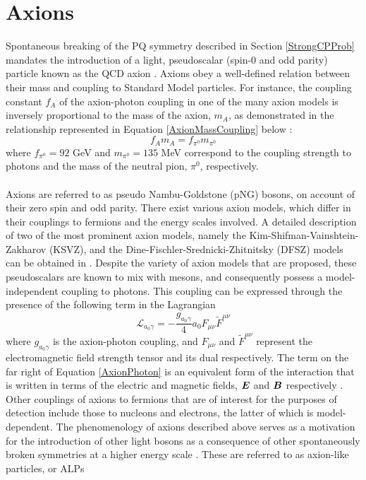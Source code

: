 \section{Axions}
Spontaneous breaking of the PQ symmetry described in Section \ref{StrongCPProb} mandates the introduction of a light, pseudoscalar (spin-0 and odd parity) particle known as the QCD axion \cite{article}. Axions obey a well-defined relation between their mass and coupling
to Standard Model particles. For instance, the coupling constant $f_{A}$ of the axion-photon coupling in one of the many axion models is inversely proportional to the mass of the axion, $m_{A}$, as demonstrated in the relationship represented in Equation \ref{AxionMassCoupling} below \cite{Michael:920}:
\begin{equation}\label{AxionMassCoupling}
    f_{A}m_{A} = f_{\pi^{0}}m_{\pi^{0}}
\end{equation}
where $f_{\pi^{0}} = 92$ GeV and $m_{\pi^{0}} = 135$ MeV correspond to the coupling strength to photons and the mass of the neutral pion, $\pi^{0}$, respectively.\\
\\
Axions are referred to as pseudo Nambu-Goldstone (pNG) bosons, on account of their zero spin and odd parity. There exist various axion models, which differ in their couplings to fermions and the energy scales involved. A detailed description of two of the most prominent axion models, namely the Kim-Shifman-Vainshtein-Zakharov (KSVZ), and the Dine-Fischler-Srednicki-Zhitnitsky (DFSZ) models can be obtained in \cite{Garcia_Irastorza_2022}.
Despite the variety of axion models that are proposed, these pseudoscalars are known to mix with mesons, and consequently possess a model-independent coupling to photons. This coupling can be expressed through the presence of the following term in the Lagrangian \cite{Garcia_Irastorza_2022}
\begin{equation}\label{AxionPhoton}
    \mathcal{L}_{a_{0}\gamma} = -\frac{g_{a_{0}\gamma}}{4}a_{0}F_{\mu\nu}\tilde{F}^{\mu\nu}
\end{equation}
where $g_{a_{0}\gamma}$ is the axion-photon coupling, and $F_{\mu\nu}$ and $\tilde{F}^{\mu\nu}$ represent the electromagnetic field strength tensor and its dual respectively. The term on the far right of Equation \ref{AxionPhoton} is an equivalent form of the interaction that is written in terms of the electric and magnetic fields, $\vb*{E}$ and $\vb*{B}$ respectively \cite{Garcia_Irastorza_2022}. Other couplings of axions
to fermions that are of interest for the purposes of detection include those to nucleons and electrons, the latter of which is model-dependent. The phenomenology of axions described above serves as a motivation for the introduction of other light bosons as a consequence of other spontaneously broken symmetries at a higher energy scale \cite{Ringwald:2012hr}. These are referred to as axion-like particles, or ALPs

